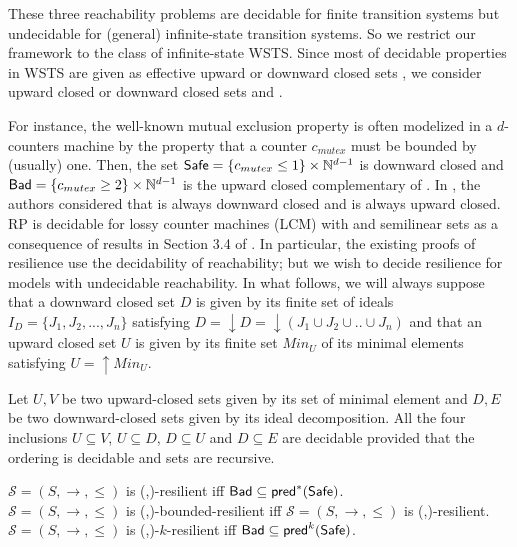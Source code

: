 
These three reachability problems are decidable for finite transition systems but undecidable for (general) infinite-state transition systems. 
So we restrict our framework to the class of infinite-state WSTS. Since most of decidable properties in WSTS are given as effective upward or downward closed sets \cite{DBLP:journals/iandc/AbdullaCJT00, DBLP:journals/tcs/FinkelS01}, we consider upward closed or downward closed sets \Safe and \Bad.

For instance, the well-known mutual exclusion property is often modelized in a $d$-counters machine by the property that a counter $c_{mutex}$ must be bounded by (usually) one. Then, the set $\textsf{Safe} =  \{c_{mutex} \leq 1\} \times \mathbb{N}^{d-1}$ is downward closed and $\textsf{Bad} =\{c_{mutex} \geq 2\} \times  \mathbb{N}^{d-1} $ is the upward closed complementary of \Safe. In \cite{DBLP:conf/gg/Ozkan22}, the authors considered that \Bad is always downward closed and \Safe is always upward closed.
%		
RP is decidable for lossy counter machines (LCM) with \Safe and \Bad semilinear sets as a consequence of results in Section 3.4 of \cite{DBLP:conf/rp/Schnoebelen10}. In particular, the existing proofs of resilience use the decidability of reachability; but we wish to decide resilience for models with undecidable reachability.
%
In what follows, we will always suppose that a downward closed set $D$ is given by its finite set of ideals $I_D=\{J_1, J_2,...,J_n\}$ satisfying $D=\downarrow D = \downarrow (J_1 \cup J_2 \cup..\cup J_n)$ and that an upward closed set $U$ is given by its finite set $Min_U$ of its minimal elements satisfying $U=\uparrow Min_U$.

Let $U,V$ be two upward-closed sets given by its set of minimal element and $D,E$ be two downward-closed sets given by its ideal decomposition. All the four  inclusions $U \subseteq V$,  $U \subseteq D$, $D \subseteq U$ and $D \subseteq E$ are decidable provided that the ordering is decidable and sets are recursive.
%


\begin{proposition}\label{general}
$\mathscr{S}=(S,\rightarrow,\leq)$ is %
(\Bad,\Safe)-resilient iff $\textsf{Bad} \subseteq \textsf{pred}^*(\textsf{Safe})$.\\
$\mathscr{S}=(S,\rightarrow,\leq)$ is %
(\Bad,\Safe)-bounded-resilient iff $\mathscr{S}=(S,\rightarrow,\leq)$ is %
(\Bad,\Safe)-resilient.\\
$\mathscr{S}=(S,\rightarrow,\leq)$ is %
(\Bad,\Safe)-$k$-resilient iff $\textsf{Bad} \subseteq \textsf{pred}^k(\textsf{Safe})$.
\end{proposition}

